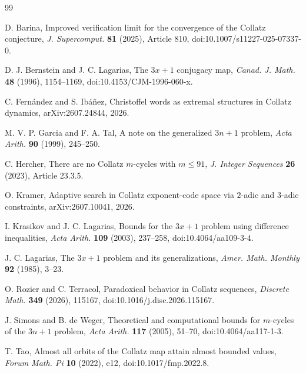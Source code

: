 \documentclass[11pt]{article}
\theoremstyle{definition}
\theoremstyle{remark}
\begin{document}
\begin{thebibliography}{99}

D. Barina,
\newblock Improved verification limit for the convergence of the Collatz conjecture,
\newblock \emph{J. Supercomput.} \textbf{81} (2025), Article 810,
\newblock doi:10.1007/s11227-025-07337-0.

D. J. Bernstein and J. C. Lagarias,
\newblock The $3x+1$ conjugacy map,
\newblock \emph{Canad. J. Math.} \textbf{48} (1996), 1154--1169,
\newblock doi:10.4153/CJM-1996-060-x.

C. Fern\'andez and S. Ib\'a\~nez,
\newblock Christoffel words as extremal structures in Collatz dynamics,
\newblock arXiv:2607.24844, 2026.

M. V. P. Garcia and F. A. Tal,
\newblock A note on the generalized $3n+1$ problem,
\newblock \emph{Acta Arith.} \textbf{90} (1999), 245--250.

C. Hercher,
\newblock There are no Collatz $m$-cycles with $m\le91$,
\newblock \emph{J. Integer Sequences} \textbf{26} (2023), Article 23.3.5.

O. Kramer,
\newblock Adaptive search in Collatz exponent-code space via $2$-adic and $3$-adic constraints,
\newblock arXiv:2607.10041, 2026.

I. Krasikov and J. C. Lagarias,
\newblock Bounds for the $3x+1$ problem using difference inequalities,
\newblock \emph{Acta Arith.} \textbf{109} (2003), 237--258,
\newblock doi:10.4064/aa109-3-4.

J. C. Lagarias,
\newblock The $3x+1$ problem and its generalizations,
\newblock \emph{Amer. Math. Monthly} \textbf{92} (1985), 3--23.

O. Rozier and C. Terracol,
\newblock Paradoxical behavior in Collatz sequences,
\newblock \emph{Discrete Math.} \textbf{349} (2026), 115167,
\newblock doi:10.1016/j.disc.2026.115167.

J. Simons and B. de Weger,
\newblock Theoretical and computational bounds for $m$-cycles of the $3n+1$ problem,
\newblock \emph{Acta Arith.} \textbf{117} (2005), 51--70,
\newblock doi:10.4064/aa117-1-3.

T. Tao,
\newblock Almost all orbits of the Collatz map attain almost bounded values,
\newblock \emph{Forum Math. Pi} \textbf{10} (2022), e12,
\newblock doi:10.1017/fmp.2022.8.



\end{thebibliography}
\end{document}

